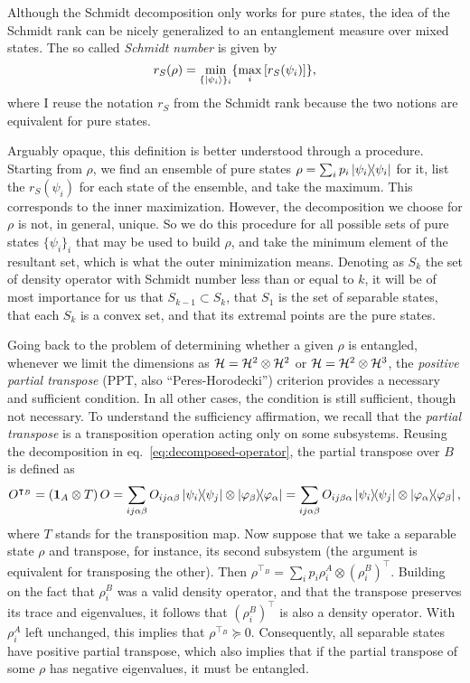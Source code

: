 		Although the Schmidt decomposition only works for pure states, the idea of the Schmidt rank can be nicely generalized to an entanglement measure over mixed states. The so called \emph{Schmidt number} \cite{terhal_2000_schmidtnumber} is given by 
		\begin{equation}
			r_S(\rho) = \min_{\{ \ket{\psi_i} \}_i} \{ \max_i \left[ r_S(\psi_i ) \right] \} ,
			\label{eq:schmidt-number}
		\end{equation}
		where I reuse the notation $r_S$ from the Schmidt rank because the two notions are equivalent for pure states.
	
		Arguably opaque, this definition is better understood through a procedure. Starting from $\rho$, we find an ensemble of pure states $\rho = \sum_i p_i \ketbra{\psi_i}{\psi_i}$ for it, list the $r_S(\psi_i)$ for each state of the ensemble, and take the maximum. This corresponds to the inner maximization. However, the decomposition we choose for $\rho$ is not, in general, unique. So we do this procedure for all possible sets of pure states $\{ \psi_i \}_i$ that may be used to build $\rho$, and take the minimum element of the resultant set, which is what the outer minimization means. Denoting as $S_k$ the set of density operator with Schmidt number less than or equal to $k$, it will be of most importance for us that $S_{k-1} \subset S_k$, that $S_1$ is the set of separable states, that each $S_k$ is a convex set, and that its extremal points are the pure states.
	
		Going back to the problem of determining whether a given $\rho$ is entangled, whenever we limit the dimensions as $\mathcal{H} = \mathcal{H}^{2} \otimes \mathcal{H}^{2}$ or $\mathcal{H} = \mathcal{H}^{2} \otimes \mathcal{H}^{3}$, the \emph{positive partial transpose} (PPT, also ``Peres-Horodecki'') criterion provides a necessary and sufficient condition. In all other cases, the condition is still sufficient, though not necessary. To understand the sufficiency affirmation, we recall that the \emph{partial transpose} is a transposition operation acting only on some subsystems. Reusing the decomposition in eq.~\eqref{eq:decomposed-operator}, the partial transpose over $B$ is defined as
		$$
			O^{\intercal_B} = (\mathbf{1}_A \otimes T)\,O = \sum_{ij\alpha\beta} O_{ij\alpha\beta} \ketbra{\psi_i}{\psi_j} \otimes \ketbra{\varphi_\beta}{\varphi_\alpha} = \sum_{ij\alpha\beta} O_{ij\beta\alpha} \ketbra{\psi_i}{\psi_j} \otimes \ketbra{\varphi_\alpha}{\varphi_\beta} , 
		$$
		where $T$ stands for the transposition map. Now suppose that we take a separable state $\rho$ and transpose, for instance, its second subsystem (the argument is equivalent for transposing the other). Then $\rho^{\intercal_B} = \sum_i p_i \rho_i^A \otimes \left( \rho_i^B \right)^\intercal$. Building on the fact that $\rho_i^B$ was a valid density operator, and that the transpose preserves its trace and eigenvalues, it follows that $\left( \rho_i^B \right)^\intercal$ is also a density operator. With $\rho_i^A$ left unchanged, this implies that $\rho^{\intercal_B} \succeq 0$. Consequently, all separable states have positive partial transpose, which also implies that if the partial transpose of some $\rho$ has negative eigenvalues, it must be entangled.
	
